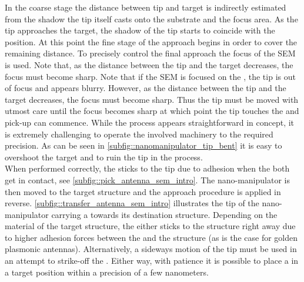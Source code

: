 	In the coarse stage the distance between tip and target \nd is indirectly estimated from the shadow the tip itself casts onto the substrate and the focus area. As the tip approaches the target, the shadow of the tip starts to coincide with the \nd position. At this point the fine stage of the approach begins in order to cover the remaining distance. To precisely control the final approach the focus of the SEM is used. Note that, as the distance between the tip and the target decreases, the focus must become sharp. Note that if the SEM is focused on the \nd, the tip is out of focus and appears blurry. However, as the distance between the tip and the target decreases, the focus must become sharp. Thus the tip must be moved with utmost care until the focus becomes sharp at which point the tip touches the \nd and pick-up can commence. While the process appears straightforward in concept, it is extremely challenging to operate the involved machinery to the required precision. As can be seen in \autoref{subfig::nanomanipulator_tip_bent} it is easy to overshoot the target and to ruin the tip in the process.
	\\
	When performed correctly, the \nd sticks to the tip due to adhesion when the both get in contact, see \autoref{subfig::pick_antenna_sem_intro}.
	The nano-manipulator is then moved to the target structure and the approach procedure is applied in reverse. \autoref{subfig::transfer_antenna_sem_intro} illustrates the tip of the nano-manipulator carrying a \nd towards its destination structure.
	Depending on the material of the target structure, the \nd either sticks to the structure right away due to higher adhesion forces between the \nd and the structure (as is the case for golden plasmonic antennas).
	Alternatively, a sideways motion of the \np tip must be used in an attempt to strike-off the \nd.
	Either way, with patience it is possible to place a \nd in a target position within a precision of a few nanometers.
	\\

